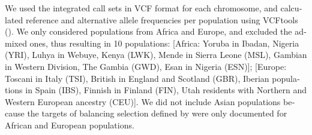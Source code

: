 \begin{refsection}
\begin{otherlanguage}{english}
We used the integrated call sets in VCF format for each chromosome, and calculated reference and alternative allele frequencies per population using VCFtools (\cite{Danecek2011}). We only considered populations from Africa and Europe, and excluded the admixed ones, thus resulting in 10 populations: [Africa: Yoruba in Ibadan, Nigeria (YRI), Luhya in Webuye, Kenya (LWK), Mende in Sierra Leone (MSL), Gambian in Western Division, The Gambia (GWD), Esan in Nigeria (ESN)]; [Europe: Toscani in Italy (TSI), British in England and Scotland (GBR), Iberian populations in Spain (IBS), Finnish in Finland (FIN), Utah residents with Northern and Western European ancestry (CEU)]. We did not include Asian populations because the targets of balancing selection defined by \textcite{Bitarello2016} were only documented for African and European populations. 




\end{otherlanguage}
\end{refsection}

